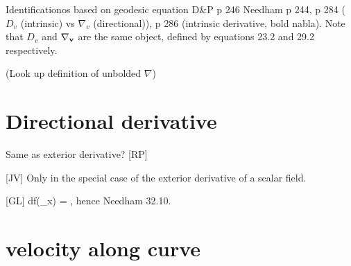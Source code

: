 \documentclass{article}
\begin{document}
Identificationos based on geodesic equation
D\&P p 246
Needham p 244, p 284 ($D_v$ (intrinsic) vs $\nabla_v$ (directional)), p 286
(intrinsic derivative, bold nabla).  Note that $D_v$ and $\bf{\nabla}_v$ are the
same object, defined by equations 23.2 and 29.2 respectively.

(Look up definition of unbolded $\nabla$)

\section{Directional derivative}

Same as exterior derivative? [RP]

[JV] Only in the special case of the exterior derivative of a scalar field.

[GL] df(\partial_x) = , hence Needham 32.10.


\section{velocity along curve}
\end{document}
